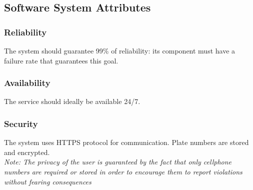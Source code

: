 \subsection{Software System Attributes}

\subsubsection{Reliability}

The system should guarantee 99\% of reliability: 
its component must have a failure rate that 
guarantees this goal.

\subsubsection{Availability}

The service should ideally be available 24/7.

\subsubsection{Security}

The system uses HTTPS protocol for communication. Plate numbers are 
stored and encrypted.\\
\textit{Note: The privacy of the user is guaranteed by the fact that 
only cellphone numbers are required or stored in order to encourage 
them to report violations without fearing consequences}